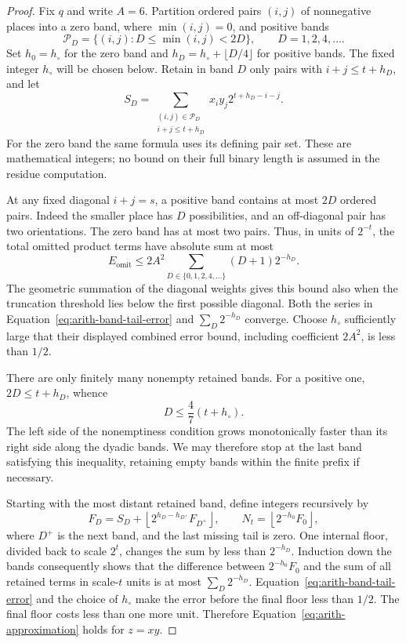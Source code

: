 \begin{proof}
Fix $q$ and write $A=6$.  Partition ordered pairs $(i,j)$ of
nonnegative places into a zero band, where $\min(i,j)=0$, and
positive bands
\[
 \mathcal P_D=\{(i,j):D\leq\min(i,j)<2D\},
 \qquad D=1,2,4,\ldots.
\]
Set $h_0=h_\circ$ for the zero band and
$h_D=h_\circ+\lfloor D/4\rfloor$ for positive bands.  The fixed
integer $h_\circ$ will be chosen below.  Retain in band $D$ only
pairs with $i+j\leq t+h_D$, and let
\begin{equation}
 S_D=\sum_{\substack{(i,j)\in\mathcal P_D\\i+j\leq t+h_D}}
           x_i y_j2^{t+h_D-i-j}.
 \label{eq:arith-band-integer}
\end{equation}
For the zero band the same formula uses its defining pair set.
These are mathematical integers; no bound on their full binary
length is assumed in the residue computation.

At any fixed diagonal $i+j=s$, a positive band contains at most
$2D$ ordered pairs.  Indeed the smaller place has $D$ possibilities,
and an off-diagonal pair has two orientations.  The zero band has
at most two pairs.  Thus, in units of $2^{-t}$, the total omitted
product terms have absolute sum at most
\begin{equation}
 E_{\mathrm{omit}}
 \leq 2A^2\sum_{D\in\{0,1,2,4,\ldots\}}(D+1)2^{-h_D}.
 \label{eq:arith-band-tail-error}
\end{equation}
The geometric summation of the diagonal weights gives this bound
also when the truncation threshold lies below the first possible
diagonal.  Both the series in Equation~\eqref{eq:arith-band-tail-error}
and $\sum_D2^{-h_D}$ converge.  Choose $h_\circ$ sufficiently large
that their displayed combined error bound, including coefficient
$2A^2$, is less than $1/2$.

There are only finitely many nonempty retained bands.  For a
positive one, $2D\leq t+h_D$, whence
\begin{equation}
 D\leq\frac47(t+h_\circ).
 \label{eq:arith-last-band}
\end{equation}
The left side of the nonemptiness condition grows monotonically
faster than its right side along the dyadic bands.  We may therefore
stop at the last band satisfying this inequality, retaining empty
bands within the finite prefix if necessary.

Starting with the most distant retained band, define integers
recursively by
\begin{equation}
 F_D=S_D+
       \left\lfloor 2^{h_D-h_{D^+}}F_{D^+}\right\rfloor,
 \qquad
 N_t=\left\lfloor2^{-h_0}F_0\right\rfloor,
 \label{eq:arith-band-recursion}
\end{equation}
where $D^+$ is the next band, and the last missing tail is zero.
One internal floor, divided back to scale $2^t$, changes the sum
by less than $2^{-h_D}$.  Induction down the bands consequently
shows that the difference between $2^{-h_0}F_0$ and the sum of
all retained terms in scale-$t$ units is at most $\sum_D2^{-h_D}$.
Equation~\eqref{eq:arith-band-tail-error} and the choice of
$h_\circ$ make the error before the final floor less than $1/2$.
The final floor costs less than one more unit.  Therefore
Equation~\eqref{eq:arith-approximation} holds for $z=xy$.


\end{proof}
